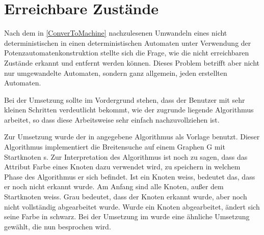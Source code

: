 \section{Erreichbare Zustände}\label{ReachableStates}

Nach dem in \ref{ConverToMachine} nachzulesenen Umwandeln eines nicht
deterministischen in einen deterministischen Automaten unter Verwendung der
Potenzautomatenkonstruktion stellte sich die Frage, wie die nicht erreichbaren
Zustände erkannt und entfernt werden können. Dieses Problem betrifft aber nicht
nur umgewandelte Automaten, sondern ganz allgemein, jeden erstellten
Automaten.\vspace{10pt}

Bei der Umsetzung sollte im Vordergrund stehen, dass der Benutzer mit sehr
kleinen Schritten verdeutlicht bekommt, wie der zugrunde liegende Algorithmus
arbeitet, so dass diese Arbeitsweise sehr einfach nachzuvollziehen
ist.\vspace{10pt}

Zur Umsetzung wurde der in  angegebene Algorithmus
als Vorlage benutzt. Dieser Algorithmus implementiert die Breitensuche auf
einem Graphen G mit Startknoten s. Zur Interpretation des Algorithmus ist noch
zu sagen, dass das Attribut Farbe eines Knoten dazu verwendet wird, zu
speichern in welchem Phase des Algorithmus er sich befindet. Ist ein Knoten
weiss, bedeutet das, dass er noch nicht erkannt wurde. Am Anfang sind alle
Knoten, außer dem Startknoten weiss. Grau bedeutet, dass der Knoten erkannt
wurde, aber noch nicht vollständig abgearbeitet wurde. Wurde ein Knoten
abgearbeitet, ändert sich seine Farbe in schwarz. Bei der Umsetzung im \gtitool
wurde eine ähnliche Umsetzung gewählt, die nun besprochen wird.\vspace{10pt}

